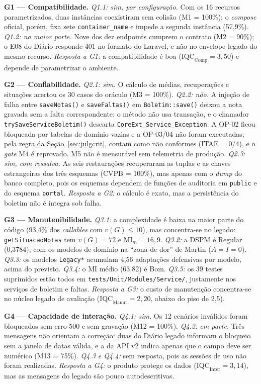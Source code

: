 \documentclass[conference]{model/IEEEtran}%
\begin{document}
\textbf{G1 --- Compatibilidade.} \textit{Q1.1: sim, por configuração.} Com os 16 recursos parametrizados, duas instâncias coexistiram sem colisão (M1 = 100\%); o \textit{compose} oficial, porém, fixa sete \texttt{container\_name} e impede a segunda instância (57,9\%). \textit{Q1.2: na maior parte.} Nove dos dez endpoints cumprem o contrato (M2 = 90\%); o E08 do Diário responde 401 no formato do Laravel, e não no envelope legado do mesmo recurso. \textit{Resposta a G1:} a compatibilidade é boa ($\text{IQC}_{\text{Comp}} = 3{,}50$) e depende de parametrizar o ambiente.

\textbf{G2 --- Confiabilidade.} \textit{Q2.1: sim.} O cálculo de médias, recuperações e situações acertou os 30 casos do oráculo (M3 = 100\%). \textit{Q2.2: não.} A injeção de falha entre \texttt{saveNotas()} e \texttt{saveFaltas()} em \texttt{Boletim::save()} deixou a nota gravada sem a falta correspondente: o método não usa transação, e o chamador \texttt{trySaveServiceBoletim()} descarta \texttt{CoreExt\_Service\_Exception}. A OP-02 ficou bloqueada por tabelas de domínio vazias e a OP-03/04 não foram executadas; pela regra da Seção~\ref{sec:julgcrit}, contam como não conformes (ITAE = 0/4), e o \textit{gate} M4 é reprovado. M5 não é mensurável sem telemetria de produção. \textit{Q2.3: sim, com ressalva.} As seis restaurações recuperaram as tuplas e as chaves estrangeiras dos três esquemas (CVPB = 100\%), mas apenas com o \textit{dump} do banco completo, pois os esquemas dependem de funções de auditoria em \texttt{public} e do esquema \texttt{portal}. \textit{Resposta a G2:} o cálculo é exato, mas a persistência do boletim não é íntegra sob falha.

\textbf{G3 --- Manutenibilidade.} \textit{Q3.1:} a complexidade é baixa na maior parte do código (93,4\% dos \textit{callables} com $v(G) \le 10$), mas concentra-se no legado: \texttt{getSituacaoNotas} tem $v(G) = 72$ e $\text{MI}_m = 16{,}9$. \textit{Q3.2:} a DSPM é Regular (0,3784), com os modelos de domínio na ``zona de dor'' de Martin ($A = I = 0$). \textit{Q3.3:} os modelos \texttt{Legacy*} acumulam 4,56 adaptações defensivas por modelo, acima do previsto. \textit{Q3.4:} o MI médio (63,82) é Bom. \textit{Q3.5:} os 39 testes suprimidos estão todos em \texttt{tests/Unit/Modules/Service/}, justamente nos serviços de boletim e faltas. \textit{Resposta a G3:} o custo de manutenção concentra-se no núcleo legado de avaliação ($\text{IQC}_{\text{Manut}} = 2{,}20$, abaixo do piso de 2,5).

\textbf{G4 --- Capacidade de interação.} \textit{Q4.1: sim.} Os 12 cenários inválidos foram bloqueados sem erro 500 e sem gravação (M12 = 100\%). \textit{Q4.2: em parte.} Três mensagens não orientam a correção: duas do Diário legado informam o bloqueio sem a janela de datas válida, e a da API v2 indica apenas que o campo deve ser numérico (M13 = 75\%). \textit{Q4.3 e Q4.4:} sem resposta, pois as sessões de uso não foram realizadas. \textit{Resposta a G4:} o produto protege os dados ($\text{IQC}_{\text{Inter}} = 3{,}14$), mas as mensagens do legado são pouco autodescritivas.
\end{document}
